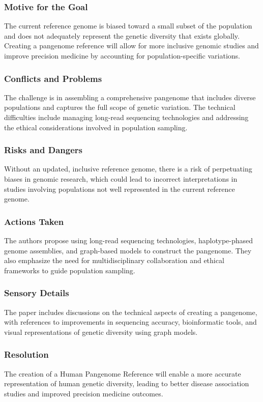 \subsubsection{Motive for the Goal}
The current reference genome is biased toward a small subset of the population and does not adequately represent the genetic diversity that exists globally. Creating a pangenome reference will allow for more inclusive genomic studies and improve precision medicine by accounting for population-specific variations.

\subsubsection{Conflicts and Problems}
The challenge is in assembling a comprehensive pangenome that includes diverse populations and captures the full scope of genetic variation. The technical difficulties include managing long-read sequencing technologies and addressing the ethical considerations involved in population sampling.

\subsubsection{Risks and Dangers}
Without an updated, inclusive reference genome, there is a risk of perpetuating biases in genomic research, which could lead to incorrect interpretations in studies involving populations not well represented in the current reference genome.

\subsubsection{Actions Taken}
The authors propose using long-read sequencing technologies, haplotype-phased genome assemblies, and graph-based models to construct the pangenome. They also emphasize the need for multidisciplinary collaboration and ethical frameworks to guide population sampling.

\subsubsection{Sensory Details}
The paper includes discussions on the technical aspects of creating a pangenome, with references to improvements in sequencing accuracy, bioinformatic tools, and visual representations of genetic diversity using graph models.

\subsubsection{Resolution}
The creation of a Human Pangenome Reference will enable a more accurate representation of human genetic diversity, leading to better disease association studies and improved precision medicine outcomes.

